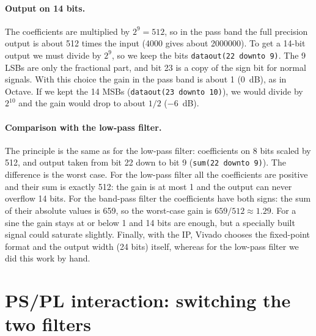 \documentclass[11pt,a4paper]{article}
\renewcommand{\_}{\oldunderscore\allowbreak}
\begin{document}
\paragraph{Output on 14 bits.}
The coefficients are multiplied by $2^9 = 512$, so in the pass band the full
precision output is about 512 times the input (\num{4000} gives about
\num{2000000}). To get a 14-bit output we must divide by $2^9$, so we keep the
bits \texttt{data\_out(22 downto 9)}. The 9 LSBs are only the fractional part,
and bit 23 is a copy of the sign bit for normal signals. With this choice the
gain in the pass band is about 1 (0~dB), as in Octave. If we kept the 14 MSBs
(\texttt{data\_out(23 downto 10)}), we would divide by $2^{10}$ and the gain
would drop to about $1/2$ ($-6$~dB).

\paragraph{Comparison with the low-pass filter.}
The principle is the same as for the low-pass filter: coefficients on 8 bits
scaled by 512, and output taken from bit 22 down to bit 9
(\texttt{sum(22 downto 9)}). The difference is the worst case. For the
low-pass filter all the coefficients are positive and their sum is exactly
512: the gain is at most 1 and the output can never overflow 14 bits. For the
band-pass filter the coefficients have both signs: the sum of their absolute
values is 659, so the worst-case gain is $659/512 \approx 1.29$. For a sine
the gain stays at or below 1 and 14 bits are enough, but a specially built
signal could saturate slightly. Finally, with the IP, Vivado chooses the
fixed-point format and the output width (24 bits) itself, whereas for the
low-pass filter we did this work by hand.

\section{PS/PL interaction: switching the two filters}
\end{document}
